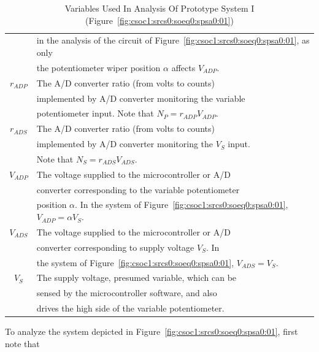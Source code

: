 \begin{table}
\begin{center}
\begin{tabular}{|c|l|}
                   & in the analysis of the circuit of Figure~\ref{fig:csoc1:srcs0:soeq0:spsa0:01}, as only  \\
                   & the potentiometer wiper position $\alpha$ affects $V_{ADP}$. \\
\hline
$r_{ADP}$          & The A/D converter ratio (from volts to counts)       \\
                   & implemented by A/D converter monitoring the variable \\
                   & potentiometer input.  Note that $N_P = r_{ADP} V_{ADP}$. \\
\hline
$r_{ADS}$          & The A/D converter ratio (from volts to counts)       \\
                   & implemented by A/D converter monitoring the $V_S$ input. \\
                   & Note that $N_S = r_{ADS} V_{ADS}$.                   \\
\hline
$V_{ADP}$          & The voltage supplied to the microcontroller or A/D   \\
                   & converter corresponding to the variable potentiometer\\
                   & position $\alpha$.  In the system of Figure~\ref{fig:csoc1:srcs0:soeq0:spsa0:01}, $V_{ADP} = \alpha V_S$.\\
\hline
$V_{ADS}$          & The voltage supplied to the microcontroller or A/D   \\
                   & converter corresponding to supply voltage $V_S$.  In \\
                   & the system of Figure~\ref{fig:csoc1:srcs0:soeq0:spsa0:01}, $V_{ADS}=V_S$.  \\
\hline
$V_S$              & The supply voltage, presumed variable, which can be  \\
                   & sensed by the microcontroller software, and also     \\
                   & drives the high side of the variable potentiometer.  \\
\hline
\end{tabular}
\end{center}
\caption{Variables Used In Analysis Of Prototype System I
         (Figure~\ref{fig:csoc1:srcs0:soeq0:spsa0:01})}
\label{tbl:csoc1:srcs0:soeq0:spsa0:01}
\end{table}

To analyze the system depicted in Figure~\ref{fig:csoc1:srcs0:soeq0:spsa0:01},
first note that

